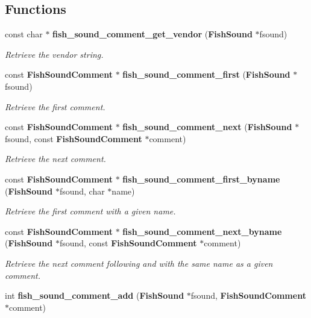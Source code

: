 \subsection*{Functions}
\begin{CompactItemize}
\item 
const char $\ast$ {\bf fish\_\-sound\_\-comment\_\-get\_\-vendor} ({\bf Fish\-Sound} $\ast$fsound)
\begin{CompactList}\small\item\em Retrieve the vendor string. \item\end{CompactList}\item 
const {\bf Fish\-Sound\-Comment} $\ast$ {\bf fish\_\-sound\_\-comment\_\-first} ({\bf Fish\-Sound} $\ast$fsound)
\begin{CompactList}\small\item\em Retrieve the first comment. \item\end{CompactList}\item 
const {\bf Fish\-Sound\-Comment} $\ast$ {\bf fish\_\-sound\_\-comment\_\-next} ({\bf Fish\-Sound} $\ast$fsound, const {\bf Fish\-Sound\-Comment} $\ast$comment)
\begin{CompactList}\small\item\em Retrieve the next comment. \item\end{CompactList}\item 
const {\bf Fish\-Sound\-Comment} $\ast$ {\bf fish\_\-sound\_\-comment\_\-first\_\-byname} ({\bf Fish\-Sound} $\ast$fsound, char $\ast$name)
\begin{CompactList}\small\item\em Retrieve the first comment with a given name. \item\end{CompactList}\item 
const {\bf Fish\-Sound\-Comment} $\ast$ {\bf fish\_\-sound\_\-comment\_\-next\_\-byname} ({\bf Fish\-Sound} $\ast$fsound, const {\bf Fish\-Sound\-Comment} $\ast$comment)
\begin{CompactList}\small\item\em Retrieve the next comment following and with the same name as a given comment. \item\end{CompactList}\item 
int {\bf fish\_\-sound\_\-comment\_\-add} ({\bf Fish\-Sound} $\ast$fsound, {\bf Fish\-Sound\-Comment} $\ast$comment)

\end{CompactItemize}
